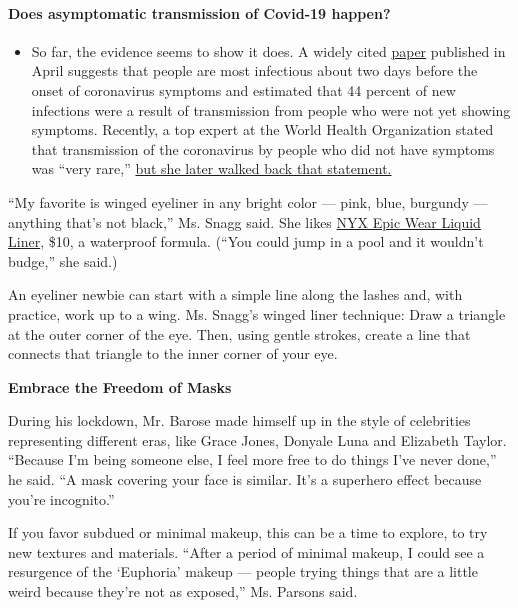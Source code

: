 \begin{itemize}
{  \paragraph{Does asymptomatic transmission of Covid-19
  happen?}\label{does-asymptomatic-transmission-of-covid-19-happen}}

  \begin{itemize}
  \tightlist
  \item
    So far, the evidence seems to show it does. A widely cited
    \href{https://www.nature.com/articles/s41591-020-0869-5}{paper}
    published in April suggests that people are most infectious about
    two days before the onset of coronavirus symptoms and estimated that
    44 percent of new infections were a result of transmission from
    people who were not yet showing symptoms. Recently, a top expert at
    the World Health Organization stated that transmission of the
    coronavirus by people who did not have symptoms was ``very rare,''
    \href{https://www.nytimes.com/2020/06/09/world/coronavirus-updates.html?action=click\&pgtype=Article\&state=default\&region=MAIN_CONTENT_3\&context=storylines_faq\#link-1f302e21}{but
    she later walked back that statement.}
  \end{itemize}
\end{itemize}

``My favorite is winged eyeliner in any bright color --- pink, blue,
burgundy --- anything that's not black,'' Ms. Snagg said. She likes
\href{https://www.nyxcosmetics.com/eyes/eyeliner/epic-wear-liquid-liner/NYX_806.html}{NYX
Epic Wear Liquid Liner}, \$10, a waterproof formula. (``You could jump
in a pool and it wouldn't budge,'' she said.)

An eyeliner newbie can start with a simple line along the lashes and,
with practice, work up to a wing. Ms. Snagg's winged liner technique:
Draw a triangle at the outer corner of the eye. Then, using gentle
strokes, create a line that connects that triangle to the inner corner
of your eye.

\textbf{Embrace the Freedom of Masks}

During his lockdown, Mr. Barose made himself up in the style of
celebrities representing different eras, like Grace Jones, Donyale Luna
and Elizabeth Taylor. ``Because I'm being someone else, I feel more free
to do things I've never done,'' he said. ``A mask covering your face is
similar. It's a superhero effect because you're incognito.''

If you favor subdued or minimal makeup, this can be a time to explore,
to try new textures and materials. ``After a period of minimal makeup, I
could see a resurgence of the `Euphoria' makeup --- people trying things
that are a little weird because they're not as exposed,'' Ms. Parsons
said.

